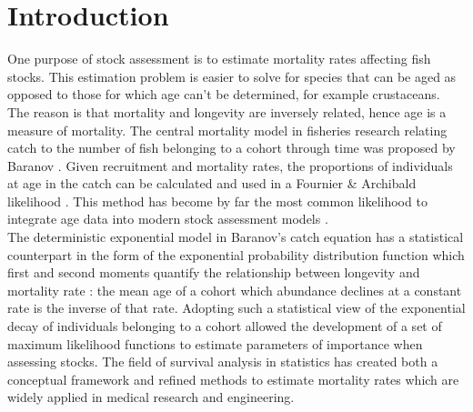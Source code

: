 \documentclass[12pt]{article}
\begin{document}
\section{Introduction}

One purpose of stock assessment is to estimate mortality rates affecting fish stocks. This estimation problem is easier to solve for species that can be aged as opposed to those for which age can't be determined, for example crustaceans. The reason is that mortality and longevity are inversely related, hence age is a measure of mortality. The central mortality model in fisheries research relating catch to the number of fish belonging to a cohort through time was proposed by Baranov \citep{quin99b}. Given recruitment and mortality rates, the proportions of individuals at age in the catch can be calculated and used in a Fournier \& Archibald likelihood  \citep{Four82a}. This method has become by far the most common likelihood to integrate age data into modern stock assessment models \citep{Francis201470, Maunder201361}.\\

The deterministic exponential model in Baranov's catch equation has a statistical counterpart in the form of the exponential probability distribution function which first and second moments quantify the relationship between longevity and mortality rate \citep{cow98b}: the mean age of a cohort which abundance declines at a constant rate is the inverse of that rate. Adopting such a statistical view of the exponential decay of individuals belonging to a cohort allowed the development of a set of maximum likelihood functions to estimate parameters of importance when assessing stocks. The field of survival analysis in statistics has created both a conceptual framework and refined methods to estimate mortality rates \citep{kleinbaum2005survival,cox84b} which are widely applied in medical research and engineering. \\ 
\end{document}

